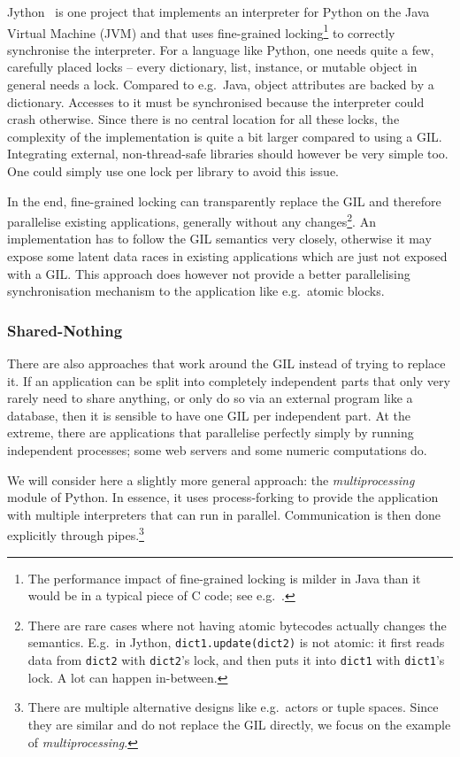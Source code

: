 \documentclass{sigplanconf}
\begin{document}
Jython~\cite{webjython} is one project that implements an
interpreter for Python on the Java Virtual Machine (JVM) and
that uses fine-grained locking\footnote{The performance impact of
fine-grained locking is milder in Java than it would be in a typical piece
of C code; see e.g.~\cite{biased}.} to correctly synchronise the
interpreter. For a language like Python, one needs quite a few,
carefully placed locks -- every dictionary, list, instance, or mutable
object in general needs a lock. Compared to e.g.\ Java, object
attributes are backed by a dictionary. Accesses to it must be
synchronised because the interpreter could crash otherwise.  Since
there is no central location for all these locks, the
complexity of the implementation is quite a bit larger compared to
using a GIL. Integrating external, non-thread-safe libraries should
however be very simple too. One could simply use one lock per library
to avoid this issue.

In the end, fine-grained locking can transparently replace the GIL and
therefore parallelise existing applications, generally without any
changes\footnote{There are rare cases where not having atomic
  bytecodes actually changes the semantics. E.g.\ in Jython,
  \texttt{dict1.update(dict2)} is not atomic: it first reads data from
  \texttt{dict2} with \texttt{dict2}'s lock, and then puts it into
  \texttt{dict1} with \texttt{dict1}'s lock. A lot can happen
  in-between.}. An implementation has to follow the GIL semantics very
closely, otherwise it may expose some latent data races in existing
applications which are just not exposed with a GIL. This approach does
however not provide a better parallelising synchronisation mechanism
to the application like e.g.\ atomic blocks.



\subsubsection{Shared-Nothing}

There are also approaches that work around the GIL instead of trying
to replace it. If an application can be split into completely
independent parts that only very rarely need to share anything, or
only do so via an external program like a database, then it is
sensible to have one GIL per independent part. At the extreme, there
are applications that parallelise perfectly simply by running
independent processes; some web servers and some numeric computations
do.

We will consider here a slightly more general approach: the
\emph{multiprocessing}~\cite{multiprocessing}
module of Python. In essence, it uses process-forking to provide the
application with multiple interpreters that can run in parallel.
Communication is then done explicitly through pipes.\footnote{There
are multiple alternative designs like e.g.\ actors or tuple spaces.
Since they are similar and do not replace the GIL directly, we
focus on the example of \emph{multiprocessing}.}
\end{document}

